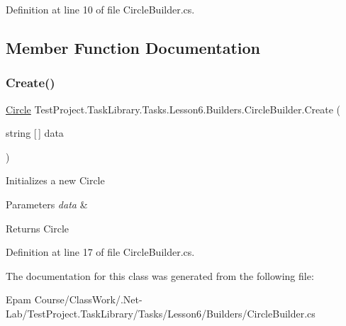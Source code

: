 Definition at line 10 of file Circle\+Builder.\+cs.



\subsection{Member Function Documentation}
\mbox{\label{class_test_project_1_1_task_library_1_1_tasks_1_1_lesson6_1_1_builders_1_1_circle_builder_a89da46ce75f30566066db3a30ed53366}} 
\subsubsection{\texorpdfstring{Create()}{Create()}}
{\footnotesize\ttfamily \mbox{\hyperlink{class_test_project_1_1_task_library_1_1_tasks_1_1_lesson6_1_1_models_1_1_circle}{Circle}} Test\+Project.\+Task\+Library.\+Tasks.\+Lesson6.\+Builders.\+Circle\+Builder.\+Create (\begin{DoxyParamCaption}\item[{string \mbox{[}$\,$\mbox{]}}]{data }\end{DoxyParamCaption})}



Initializes a new Circle 


\begin{DoxyParams}{Parameters}
{\em data} & \\
\hline
\end{DoxyParams}
\begin{DoxyReturn}{Returns}
Circle
\end{DoxyReturn}


Definition at line 17 of file Circle\+Builder.\+cs.



The documentation for this class was generated from the following file\+:\begin{DoxyCompactItemize}
\item 
Epam Course/\+Class\+Work/.\+Net-\/\+Lab/\+Test\+Project.\+Task\+Library/\+Tasks/\+Lesson6/\+Builders/Circle\+Builder.\+cs\end{DoxyCompactItemize}
